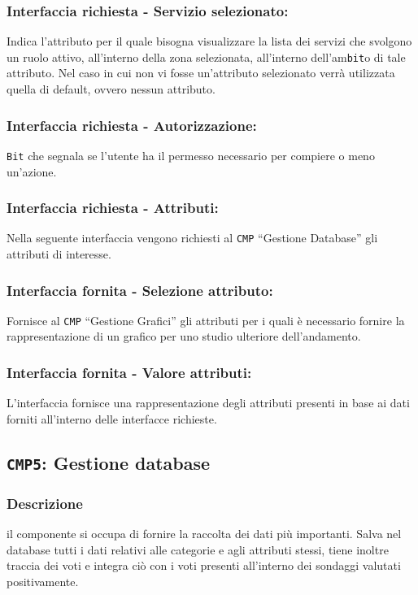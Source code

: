         \subsubsection{Interfaccia richiesta - Servizio selezionato:}
            Indica l'attributo per il quale bisogna visualizzare la lista dei servizi che svolgono un ruolo attivo, all'interno della zona selezionata, all'interno dell'am\texttt{bit}o di tale attributo. Nel caso in cui non vi fosse un'attributo selezionato verrà utilizzata quella di default, ovvero nessun attributo.
        \subsubsection{Interfaccia richiesta - Autorizzazione:}
            \texttt{Bit} che segnala se l'utente ha il permesso necessario per compiere o meno un'azione.
        \subsubsection{Interfaccia richiesta - Attributi:}
            Nella seguente interfaccia vengono richiesti al \texttt{CMP} ``Gestione Database'' gli attributi di  interesse.
        \subsubsection{Interfaccia fornita - Selezione attributo:}
            Fornisce al \texttt{CMP} ``Gestione Grafici'' gli attributi per i quali è necessario fornire la rappresentazione di un grafico per uno studio ulteriore dell'andamento.
        \subsubsection{Interfaccia fornita - Valore attributi:}
            L'interfaccia fornisce una rappresentazione degli attributi presenti in base ai dati forniti all'interno delle interfacce richieste.

    \subsection{\texttt{CMP5}: Gestione database}
        \subsubsection{Descrizione} 
            il componente si occupa di fornire la raccolta dei dati più importanti. Salva nel database tutti i dati relativi alle categorie e agli attributi stessi, tiene inoltre traccia dei voti e integra ciò con i voti presenti all'interno dei sondaggi valutati positivamente.
